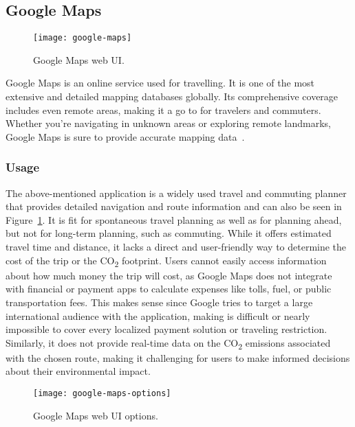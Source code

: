 \subsection{Google Maps}\label{subsec:google-maps}

\begin{figure}
    \centering
    \texttt{[image: google-maps]}
    \caption{Google Maps web UI.}
    \label{fig:google-maps-ui}
\end{figure}

Google Maps is an online service used for travelling.
It is one of the most extensive and detailed mapping databases globally.
Its comprehensive coverage includes even remote areas, making it a go to for travelers and commuters.
Whether you're navigating in unknown areas or exploring remote landmarks, Google Maps is sure to provide accurate
mapping data~\cite{googlemaps2023}.

\subsubsection{Usage}\label{subsubsec:usage}

The above-mentioned application is a widely used travel and commuting planner that provides detailed navigation and
route information and can also be seen in Figure~\ref{fig:google-maps-ui}.
It is fit for spontaneous travel planning as well as for planning ahead, but not for long-term planning, such as
commuting.
While it offers estimated travel time and distance, it lacks a direct and user-friendly way to determine the cost of the
trip or the \unit{CO_{2}} footprint.
Users cannot easily access information about how much money the trip will cost, as Google Maps does not integrate with
financial or payment apps to calculate expenses like tolls, fuel, or public transportation fees.
This makes sense since Google tries to target a large international audience with the application, making is difficult
or nearly impossible to cover every localized payment solution or traveling restriction.
Similarly, it does not provide real-time data on the \unit{CO_{2}} emissions associated with the chosen route, making it
challenging for users to make informed decisions about their environmental impact.

\begin{wrapfigure}{l}{0.5\textwidth}
    \begin{center}
        \texttt{[image: google-maps-options]}
    \end{center}
    \caption{Google Maps web UI options.}
    \label{fig:google-maps-options}
\end{wrapfigure}

